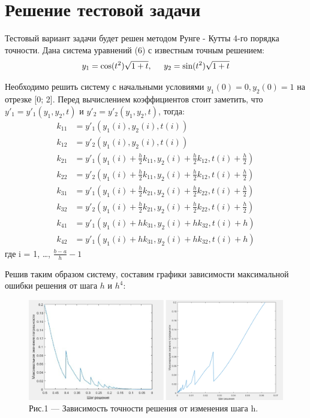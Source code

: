 \documentclass[a4paper,12pt]{article}
\begin{document}
\section{Решение тестовой задачи}
\hspace{0.5cm} Тестовый вариант задачи будет решен методом Рунге - Кутты 4-го порядка точности.
Дана система уравнений (6) с известным точным решением:
\begin{equation}
    y_1 = \cos(t^2)\sqrt{1 + t}, \hspace{0.5cm} y_2 = \sin(t^2)\sqrt{1 + t}
\end{equation}

Необходимо решить систему с начальными условиями $y_1(0) = 0, y_2(0) = 1$ на отрезке [0; 2].
Перед вычислением коэффициентов стоит заметить, что $y'_1 = y'_1(y_1, y_2, t)$ и $y'_2 = y'_2(y_1, y_2, t)$,
тогда:
\begin{align}
    k_{11} &= y'_1(y_1(i), y_2(i), t(i)) \nonumber \\
    k_{12} &= y'_2(y_1(i), y_2(i), t(i)) \nonumber \\
    k_{21} &= y'_1(y_1(i) + \frac{h}{2}k_{11}, y_2(i) + \frac{h}{2}k_{12}, t(i) + \frac{h}{2}) \nonumber \\
    k_{22} &= y'_2(y_1(i) + \frac{h}{2}k_{11}, y_2(i) + \frac{h}{2}k_{12}, t(i) + \frac{h}{2}) \nonumber \\
    k_{31} &= y'_1(y_1(i) + \frac{h}{2}k_{21}, y_2(i) + \frac{h}{2}k_{22}, t(i) + \frac{h}{2}) \\
    k_{32} &= y'_2(y_1(i) + \frac{h}{2}k_{21}, y_2(i) + \frac{h}{2}k_{22}, t(i) + \frac{h}{2}) \nonumber \\
    k_{41} &= y'_1(y_1(i) + hk_{31}, y_2(i) + hk_{32}, t(i) + h) \nonumber \\
    k_{42} &= y'_1(y_1(i) + hk_{31}, y_2(i) + hk_{32}, t(i) + h) \nonumber
\end{align}
где i = 1, \dots, $\frac{b-a}{h} - 1$

Решив таким образом систему, составим графики зависимости максимальной ошибки решения от шага $h$ и $h^4$:
\begin{figure}[h]
    \centering
    \includegraphics[width=1\linewidth]{pictures/testTask.png}
    \captionsetup{labelformat=empty}
    \caption{Рис.1 --- Зависимость точности решения от изменения шага h.}
\end{figure}
\end{document}
